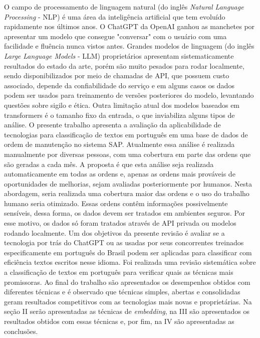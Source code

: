 \documentclass[conference]{IEEEtran}
\begin{document}
  O campo de processamento de linguagem natural (do inglês \textit{Natural Language Processing} - NLP) é uma área da inteligência artificial que tem evoluído rapidamente nos últimos anos. O ChatGPT da OpenAI \cite{NIPS2017_3f5ee243} \cite{Radford2018ImprovingLU} \cite{radford_language_2019} \cite{brown2020language} ganhou as manchetes por apresentar um modelo que consegue "conversar" com o usuário com uma facilidade e fluência nunca vistos antes. Grandes modelos de linguagem (do inglês \textit{Large Language Models} - LLM) proprietários apresentam sistematicamente resultados do estado da arte, porém são muito pesados para rodar localmente, sendo disponibilizados por meio de chamadas de API, que possuem custo associado, depende da confiabilidade do serviço e em alguns casos os dados podem ser usados para treinamento de versões posteriores do modelo, levantando questões sobre sigilo e ética. Outra limitação atual dos modelos baseados em transformers é o tamanho fixo da entrada, o que inviabiliza alguns tipos de análise. O presente trabalho apresenta a avaliação da aplicabilidade de tecnologias para classificação de textos em português em uma base de dados de ordem de manutenção no sistema SAP. Atualmente essa análise é realizada manualmente por diversas pessoas, com uma cobertura em parte das ordens que são geradas a cada mês. A proposta é que esta análise seja realizada automaticamente em todas as ordens e, apenas as ordens mais prováveis de oportunidades de melhorias, sejam avaliadas posteriormente por humanos. Nesta abordagem, seria realizada uma cobertura maior das ordens e o uso do trabalho humano seria otimizado. Essas ordens contêm informações possivelmente sensíveis, dessa forma, os dados devem ser tratados em ambientes seguros. Por esse motivo, os dados só foram tratados através de API privada ou modelos rodando localmente. Um dos objetivos da presente revisão é avaliar se a tecnologia por trás do ChatGPT ou as usadas por seus concorrentes treinados especificamente em português do Brasil \cite{souza2020bertimbau} \cite{Gomes2021} podem ser aplicadas para classificar com eficiência textos escritos nesse idioma. Foi realizada uma revisão sistemática sobre a classificação de textos em português para verificar quais as técnicas mais promissoras. Ao final do trabalho são apresentados os desempenhos obtidos com diferentes técnicas e é observado que técnicas simples, abertas e consolidadas geram resultados competitivos com as tecnologias mais novas e proprietárias.
  Na seção II serão apresentadas as técnicas de \textit{embedding}, na III são apresentados os resultados obtidos com essas técnicas e, por fim, na IV são apresentadas as conclusões.
\end{document}
